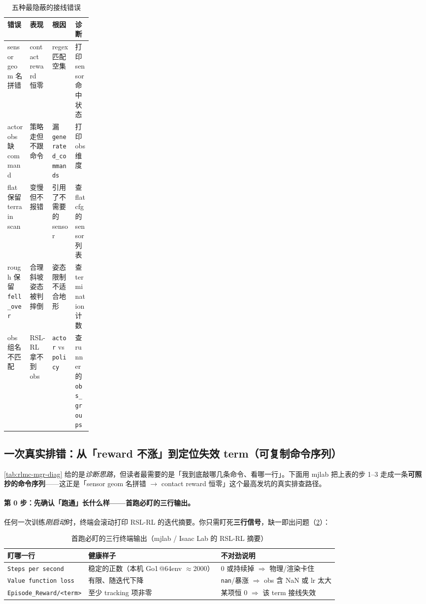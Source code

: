 \begin{table}[ht]
\centering
\caption{五种最隐蔽的接线错误}
\label{tab:rlmc-mgr-wiringbugs}
\footnotesize
\begin{tabular}{@{}lllp{0.2\linewidth}@{}}
\toprule
错误 & 表现 & 根因 & 诊断 \\
\midrule
sensor geom 名拼错 & contact reward 恒零 & regex 匹配空集 & 打印 sensor 命中状态 \\
actor obs 缺 command & 策略走但不跟命令 & 漏 \verb|generated_commands| & 打印 obs 维度 \\
flat 保留 terrain scan & 变慢但不报错 & 引用了不需要的 sensor & 查 flat cfg 的 sensor 列表 \\
rough 保留 \verb|fell_over| & 合理斜坡姿态被判摔倒 & 姿态限制不适合地形 & 查 termination 计数 \\
obs 组名不匹配 & RSL-RL 拿不到 obs & \verb|actor| vs \verb|policy| & 查 runner 的 \verb|obs_groups| \\
\bottomrule
\end{tabular}
\end{table}

\subsection{一次真实排错：从「reward 不涨」到定位失效 term（可复制命令序列）}
\label{sec:rlmc-mgr-debugwalk}

\cref{tab:rlmc-mgr-diag} 给的是\emph{诊断思路}，但读者最需要的是「我到底敲哪几条命令、看哪一行」。下面用 mjlab 把上表的步 1--3 走成一条\textbf{可照抄的命令序列}——这正是「sensor geom 名拼错 $\to$ contact reward 恒零」这个最高发坑的真实排查路径。

\paragraph{第 0 步：先确认「跑通」长什么样——首跑必盯的三行输出。}任何一次训练\emph{刚启动}时，终端会滚动打印 RSL-RL 的迭代摘要。你只需盯死\textbf{三行信号}，缺一即出问题（\cref{tab:rlmc-mgr-firstrun}）：

\begin{table}[ht]
\centering
\caption{首跑必盯的三行终端输出（mjlab / Isaac Lab 的 RSL-RL 摘要）}
\label{tab:rlmc-mgr-firstrun}
\small
\begin{tabular}{@{}lll@{}}
\toprule
盯哪一行 & 健康样子 & 不对劲说明 \\
\midrule
\verb|Steps per second| & 稳定的正数（本机 Go1\,@64env $\approx$2000） & 0 或持续掉 $\Rightarrow$ 物理/渲染卡住 \\
\verb|Value function loss| & 有限、随迭代下降 & \verb|nan|/暴涨 $\Rightarrow$ obs 含 NaN 或 lr 太大 \\
\verb|Episode_Reward/<term>| & 至少 tracking 项非零 & 某项恒 0 $\Rightarrow$ 该 term 接线失效 \\
\bottomrule
\end{tabular}
\end{table}

